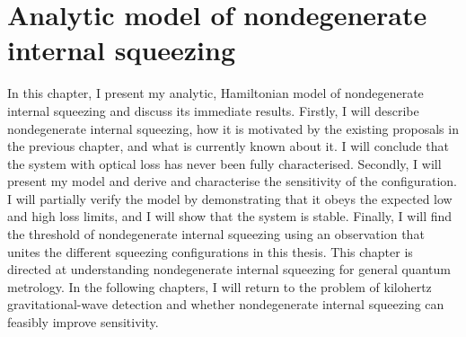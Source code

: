 \chapter{Analytic model of nondegenerate internal squeezing} %
\label{chp:nIS_analytics}





In this chapter, I present my analytic, Hamiltonian model of nondegenerate internal squeezing and discuss its immediate results.
Firstly, I will describe nondegenerate internal squeezing, how it is motivated by the existing proposals in the previous chapter, and what is currently known about it. I will conclude that the system with optical loss has never been fully characterised. Secondly, I will present my model and derive and characterise the sensitivity of the configuration. I will partially verify the model by demonstrating that it obeys the expected low and high loss limits, and I will show that the system is stable. Finally, I will find the threshold of nondegenerate internal squeezing using an observation that unites the different squeezing configurations in this thesis. 
This chapter is directed at understanding nondegenerate internal squeezing for general quantum metrology. In the following chapters, I will return to the problem of kilohertz gravitational-wave detection and whether nondegenerate internal squeezing can feasibly improve sensitivity. 


